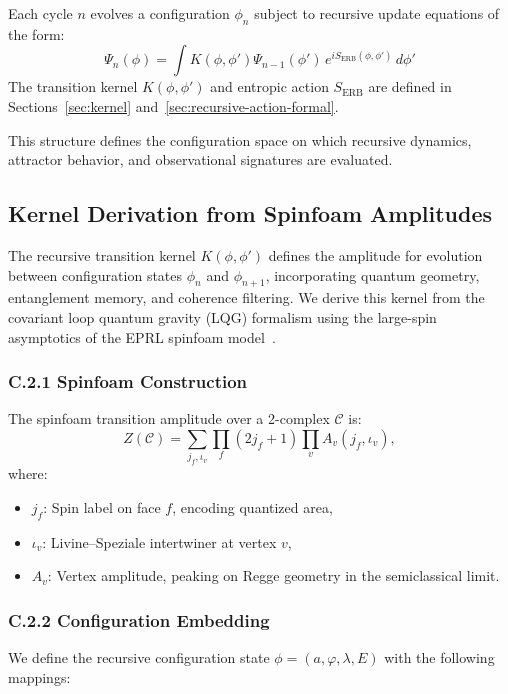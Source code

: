 Each cycle \( n \) evolves a configuration \( \phi_n \) subject to recursive update equations of the form:
\[
\Psi_n(\phi) = \int K(\phi, \phi') \Psi_{n-1}(\phi') \, e^{i S_{\text{ERB}}(\phi, \phi')} \, d\phi'
\]
The transition kernel \( K(\phi, \phi') \) and entropic action \( S_{\text{ERB}} \) are defined in Sections~\ref{sec:kernel} and~\ref{sec:recursive-action-formal}.

This structure defines the configuration space on which recursive dynamics, attractor behavior, and observational signatures are evaluated.

\subsection*{Kernel Derivation from Spinfoam Amplitudes}
\label{appendix:C2}

The recursive transition kernel \( K(\phi, \phi') \) defines the amplitude for evolution between configuration states \(\phi_n\) and \(\phi_{n+1}\), incorporating quantum geometry, entanglement memory, and coherence filtering. We derive this kernel from the covariant loop quantum gravity (LQG) formalism using the large-spin asymptotics of the EPRL spinfoam model~\cite{barrett2009asymptotic, engle2008lqg}.

\subsubsection*{C.2.1 Spinfoam Construction}

The spinfoam transition amplitude over a 2-complex \(\mathcal{C}\) is:
\[
Z(\mathcal{C}) = \sum_{j_f, \iota_v} \prod_f (2j_f + 1) \prod_v A_v(j_f, \iota_v),
\]
where:
\begin{itemize}
  \item \( j_f \): Spin label on face \( f \), encoding quantized area,
  \item \( \iota_v \): Livine--Speziale intertwiner at vertex \( v \),
  \item \( A_v \): Vertex amplitude, peaking on Regge geometry in the semiclassical limit.
\end{itemize}

\subsubsection*{C.2.2 Configuration Embedding}

We define the recursive configuration state \(\phi = (a, \varphi, \lambda, E)\) with the following mappings:

